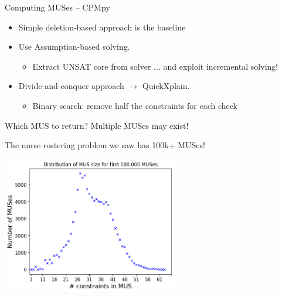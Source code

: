 \documentclass{cons-beamer}
\begin{document}
\begin{flashcardcpmpy}
\begin{frame}{Computing MUSes -- CPMpy}
  \begin{itemize}
    \item Simple deletion-based approach is the baseline
          \begin{example}
          \end{example}   

    \item Use Assumption-based solving.
          \begin{itemize}
            \item Extract UNSAT core from solver ... and exploit incremental solving!
          \end{itemize}
          \begin{example}
          \end{example}    
    \item Divide-and-conquer approach $\xrightarrow{}$ QuickXplain.
          \begin{itemize}
            \item Binary search: remove half the constraints for each check
          \end{itemize}
          \begin{example}
          \end{example}
  \end{itemize}
\end{frame}
\end{flashcardcpmpy}

\begin{frame}{Which MUS to return?}
  Multiple MUSes may exist! 

  The nurse rostering problem we saw has 100k+ MUSes!
  \begin{center}
    \includegraphics[height=60mm]{images/texpl_img/musses.png}
  \end{center}
\end{frame}
\end{document}
